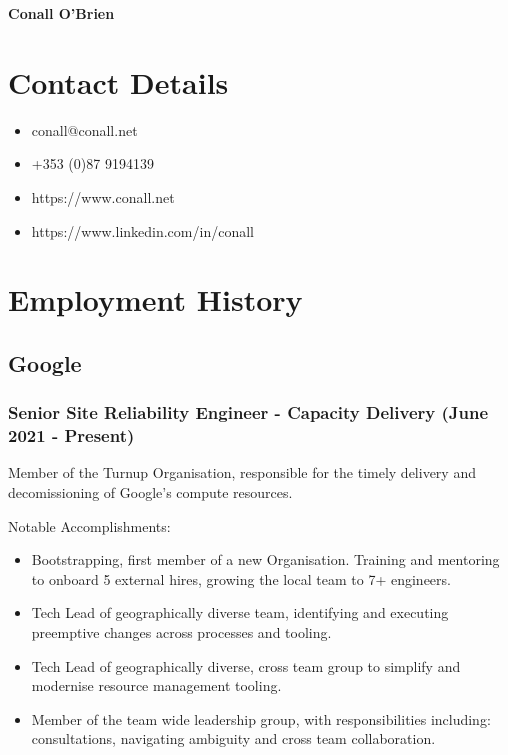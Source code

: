 \documentclass[a4paper, 10pt] {article}
\begin{document}
\begingroup
  \centering
  \LARGE \textbf{Conall O'Brien}\\[1.5em]
\endgroup

\section*{Contact Details}

\begin{itemize}[itemsep=2pt,parsep=2pt]
 \item conall@conall.net
 \item +353 (0)87 9194139
 \item https://www.conall.net
 \item https://www.linkedin.com/in/conall
\end{itemize}

\hrulefill

\section*{Employment History}

\subsection*{Google}

\subsubsection*{Senior Site Reliability Engineer - Capacity Delivery (June 2021 - Present)}

Member of the Turnup Organisation, responsible for the timely delivery and
decomissioning of Google's compute resources.

\vspace{4mm}  %

Notable Accomplishments:

\begin{itemize}[itemsep=2pt,parsep=2pt]
  \item Bootstrapping, first member of a new Organisation. Training and mentoring to onboard 5 external hires, growing the local team to 7+ engineers.
  \item Tech Lead of geographically diverse team, identifying and executing preemptive changes across processes and tooling.
  \item Tech Lead of geographically diverse, cross team group to simplify and modernise resource management tooling.
  \item Member of the team wide leadership group, with responsibilities including: consultations, navigating ambiguity and cross team collaboration.
\end{itemize}
\end{document}
